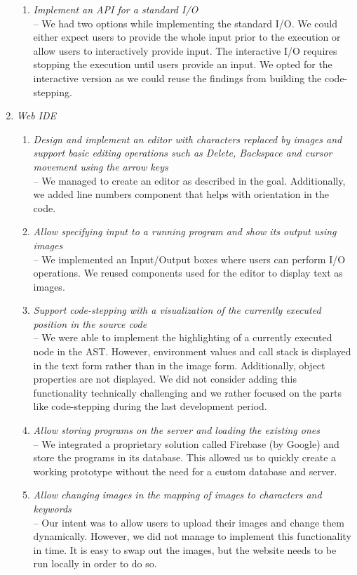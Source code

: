 \begin{enumerate}
\begin{enumerate}[label=(\alph*)]
	 \item \textit{Implement an API for a standard I/O} \\
     -- We had two options while implementing the standard I/O. We could either expect users to provide the whole input prior to the execution or allow users
     to interactively provide input. The interactive I/O requires stopping the execution until users provide an input. We opted for the interactive version as we
     could reuse the findings from building the code-stepping.
   \end{enumerate}
   \newpage
\item \textit{Web IDE}
   \begin{enumerate}[label=(\alph*)]
     \item \textit{Design and implement an editor with characters replaced by images and support basic editing operations such as Delete,
     Backspace and cursor movement using the arrow keys} \\
     -- We managed to create an editor as described in the goal. Additionally, we added line numbers component that helps with orientation in the code.
	 \item \textit{Allow specifying input to a running program and show its output using images} \\
     -- We implemented an Input/Output boxes where users can perform I/O operations. We reused components used for the editor to display text as
     images.
	 \item \textit{Support code-stepping with a visualization of the currently executed position in the source code} \\
     -- We were able to implement the highlighting of a currently executed node in the AST. However, environment values and call stack
     is displayed in the text form rather than in the image form. Additionally, object properties are not displayed. We did not consider adding this functionality
     technically challenging and we rather focused on the parts like code-stepping during the last development period.
	 \item \textit{Allow storing programs on the server and loading the existing ones} \\
     -- We integrated a proprietary solution called Firebase \cite{Firebase} (by Google) and store the programs in its database. This allowed us to quickly create
     a working prototype without the need for a custom database and server.
	 \item \textit{Allow changing images in the mapping of images to characters and keywords} \\
     -- Our intent was to allow users to upload their images and change them dynamically. However, we did not manage to implement this functionality
     in time. It is easy to swap out the images, but the website needs to be run locally in order to do so.
   \end{enumerate}
\end{enumerate}

